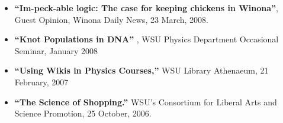 \documentclass[margin,line,letterpaper]{res}
\begin{document}
\begin{resume}
\begin{itemize}
\item 
\textbf{``Im-peck-able logic: The case for keeping chickens in Winona''},
Guest Opinion, Winona Daily News, 23 March, 2008.
	

\item 
\textbf{``Knot Populations in DNA''}
, WSU Physics Department Occasional Seminar, January 2008
%	

\item 
\textbf{``Using Wikis in Physics Courses,''}
	WSU Library Athenaeum, 21 February, 2007 
%
	
\item 
\textbf{``The Science of Shopping.''} 
	WSU's Consortium for Liberal Arts and Science Promotion,  25 October, 2006.
%


\end{itemize}
\end{resume}
\end{document}
